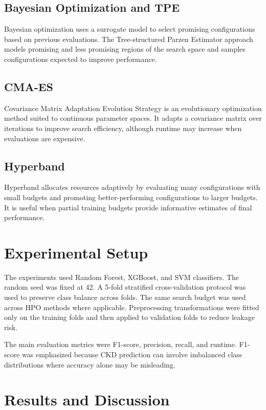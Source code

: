 \documentclass[runningheads]{llncs}
\begin{document}
\subsection{Bayesian Optimization and TPE}

Bayesian optimization uses a surrogate model to select promising configurations based on previous evaluations. The Tree-structured Parzen Estimator approach models promising and less promising regions of the search space and samples configurations expected to improve performance.

\subsection{CMA-ES}

Covariance Matrix Adaptation Evolution Strategy is an evolutionary optimization method suited to continuous parameter spaces. It adapts a covariance matrix over iterations to improve search efficiency, although runtime may increase when evaluations are expensive.

\subsection{Hyperband}

Hyperband allocates resources adaptively by evaluating many configurations with small budgets and promoting better-performing configurations to larger budgets. It is useful when partial training budgets provide informative estimates of final performance.

\section{Experimental Setup}

The experiments used Random Forest, XGBoost, and SVM classifiers. The random seed was fixed at 42. A 5-fold stratified cross-validation protocol was used to preserve class balance across folds. The same search budget was used across HPO methods where applicable. Preprocessing transformations were fitted only on the training folds and then applied to validation folds to reduce leakage risk.

The main evaluation metrics were F1-score, precision, recall, and runtime. F1-score was emphasized because CKD prediction can involve imbalanced class distributions where accuracy alone may be misleading.

\section{Results and Discussion}
\end{document}

